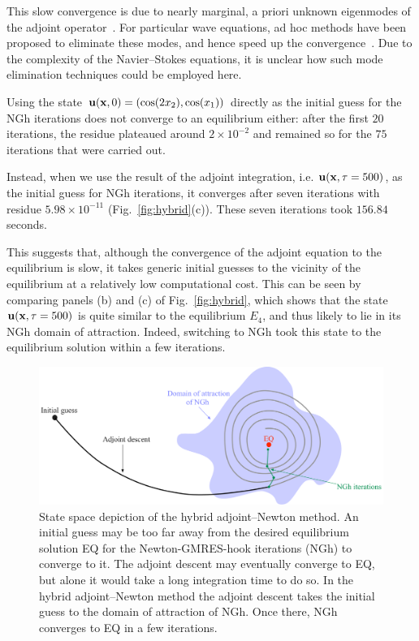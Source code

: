 \documentclass{jfm}
\begin{document}
This slow convergence is due to nearly marginal, a priori unknown eigenmodes of the adjoint
operator~\citep{LY07}. For particular wave equations, ad hoc
methods have been proposed to eliminate these modes, and hence speed up the
convergence~\citep{yang07}.
Due to the complexity of the Navier--Stokes equations, it is unclear how such mode elimination
techniques could be employed here.

Using the state $\mathbf u(\mathbf x,0)=(\cos(2x_2),\cos(x_1))$ directly as the initial
guess for the NGh iterations does not converge to an equilibrium either: after the first $20$
iterations, the residue plateaued around $2\times 10^{-2}$ and remained so for the $75$ iterations
that were carried out.

Instead, when we use the result of the adjoint integration, i.e. $\mathbf u(\mathbf x,\tau=500)$, as the
initial guess for NGh iterations, it converges after seven iterations with residue
$5.98\times 10^{-11}$ (Fig.~\ref{fig:hybrid}(c)). These seven iterations took $156.84$ seconds.

This suggests that, although the convergence of the adjoint equation to the equilibrium is slow, it
takes generic initial guesses to the vicinity of the equilibrium at a relatively low computational
cost. This can be seen by comparing panels (b) and (c) of Fig.~\eqref{fig:hybrid}, which
shows that the state $\mathbf u(\mathbf x,\tau=500)$ is quite similar to the equilibrium $E_4$,
and thus likely to lie in its NGh domain of attraction. Indeed, switching to
NGh took this state to the equilibrium solution within a few iterations.

\begin{figure}
\centering
\includegraphics[width=\textwidth]{hybrid_schem}
\caption{
State space depiction of the hybrid adjoint--Newton method. An initial
guess may be too far away from the desired equilibrium solution EQ for
the Newton-GMRES-hook iterations (NGh) to converge to it. The adjoint
descent may eventually converge to EQ, but alone it would take a long
integration time to do so. In the hybrid adjoint--Newton method the
adjoint descent takes the initial guess to the domain of attraction of
NGh. Once there, NGh  converges to EQ in a few iterations.
}
\label{fig:hybrid_schem}
\end{figure}
\end{document}
